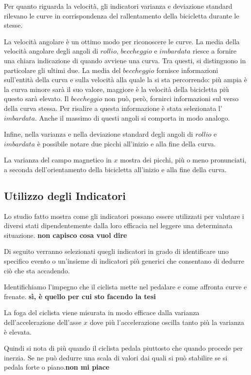 \documentclass[12pt]{article}
\begin{document}
	Per quanto riguarda la velocità, gli indicatori varianza e deviazione standard rilevano le curve in corrispondenza del rallentamento della bicicletta durante le stesse.\hfill\break
	
	La velocità angolare è un ottimo modo per riconoscere le curve. La media della velocità angolare degli angoli di \(rollio\), \(beccheggio\) e \(imbardata\) riesce a fornire una chiara indicazione di quando avviene una curva. Tra questi, si distinguono in particolare gli ultimi due. La media del \(beccheggio\) fornisce informazioni sull'entità della curva e sulla velocità alla quale la si sta percorrendo: più ampia è la curva minore sarà il suo valore, maggiore è la velocità della bicicletta più questo sarà elevato. Il \(beccheggio\) non può, però, fornirci informazioni sul verso della curva stessa. Per risalire a questa informazione è stata selezionata l'\(imbardata\). Anche il massimo di questi angoli si comporta in modo analogo.
	
	Infine, nella varianza e nella deviazione standard degli angoli di \(rollio\) e \(imbardata\) è possibile notare due picchi all'inizio e alla fine della curva.\hfill\break
	
	La varianza del campo magnetico in \(x\) mostra dei picchi, più o meno pronunciati, a seconda dell'orientamento della bicicletta all'inizio e alla fine della curva.
	
	\subsection{Utilizzo degli Indicatori}
	Lo studio fatto mostra come gli indicatori possano essere utilizzati per valutare i diversi stati dipendentemente dalla loro efficacia nel leggere una determinata situazione. \textbf{non capisco cosa vuol dire}
	
	Di seguito verranno selezionati quegli indicatori in grado di identificare uno specifico evento o un'insieme di indicatori più generici che consentano di dedurre ciò che sta accadendo.
	
	Identifichiamo l'impegno che il ciclista mette nel pedalare e come affronta curve e frenate. \textbf{sì, è quello per cui sto facendo la tesi}
	
	La foga del ciclista viene misurata in modo efficace dalla varianza dell'accelerazione dell'asse \(x\) dove più l'accelerazione oscilla tanto più la varianza è elevata. 
	
	Quindi si nota di più quando il ciclista pedala piuttosto che quando procede per inerzia. Se ne può dedurre una scala di valori dai quali si può stabilire se si pedala forte o piano.\textbf{non mi piace}
	
\end{document}
